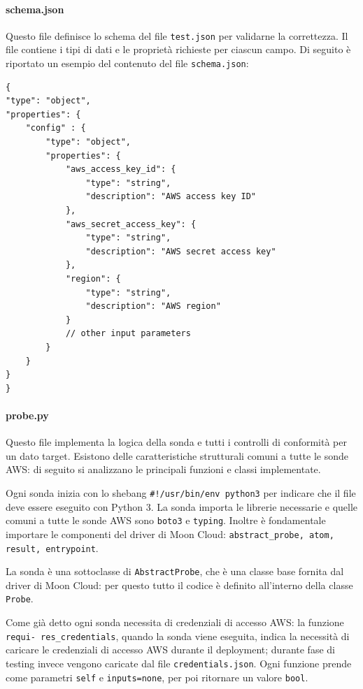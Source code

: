 \paragraph{schema.json} Questo file definisce lo schema del file \texttt{test.json} per validarne la correttezza. Il file contiene i tipi di dati e le proprietà richieste per ciascun campo. Di seguito è riportato un esempio del contenuto del file \texttt{schema.json}:

\begin{lstlisting}[style=myjson]
{
"type": "object",
"properties": {
    "config" : {
        "type": "object",
        "properties": {
            "aws_access_key_id": {
                "type": "string",
                "description": "AWS access key ID"
            },
            "aws_secret_access_key": {
                "type": "string",
                "description": "AWS secret access key"
            },
            "region": {
                "type": "string",
                "description": "AWS region"
            }
            // other input parameters 
        }
    }
}   
}
\end{lstlisting}

\paragraph{probe.py} Questo file implementa la logica della sonda e tutti i controlli di conformità per un dato target. Esistono delle caratteristiche strutturali comuni a tutte le sonde AWS: di seguito si analizzano le principali funzioni e classi implementate.

Ogni sonda inizia con lo shebang \texttt{\#!/usr/bin/env python3} per indicare che il file deve essere eseguito con Python 3. La sonda importa le librerie necessarie e quelle comuni a tutte le sonde AWS sono \texttt{boto3} e \texttt{typing}. Inoltre è fondamentale importare le componenti del driver di Moon Cloud: \texttt{abstract\_probe, atom, result, entrypoint}.

La sonda è una sottoclasse di \texttt{AbstractProbe}, che è una classe base fornita dal driver di Moon Cloud: per questo tutto il codice è definito all'interno della classe \texttt{Probe}. 

Come già detto ogni sonda necessita di credenziali di accesso AWS: la funzione \texttt{requi-
res\_credentials}, quando la sonda viene eseguita, indica la necessità di caricare le credenziali di accesso AWS durante il deployment; durante fase di testing invece vengono caricate dal file \texttt{credentials.json}. Ogni funzione prende come parametri \texttt{self} e \texttt{inputs=none}, per poi ritornare un valore \texttt{bool}. 

